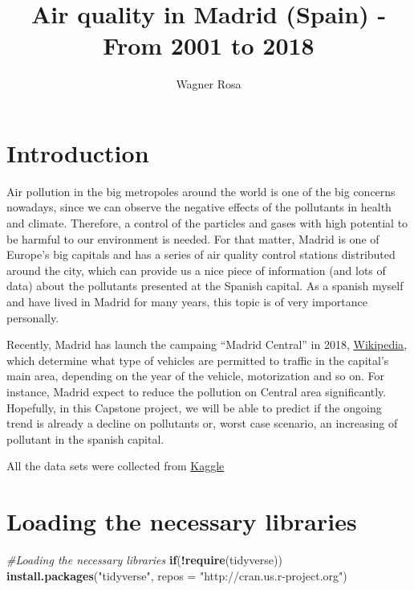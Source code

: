 \documentclass[
]{article}
\title{Air quality in Madrid (Spain) - From 2001 to 2018}
\author{Wagner Rosa}
\date{}
\newenvironment{Shaded}{\begin{snugshade}}{\end{snugshade}}
\newcommand{\CommentTok}[1]{\textcolor[rgb]{0.56,0.35,0.01}{\textit{#1}}}
\newcommand{\ControlFlowTok}[1]{\textcolor[rgb]{0.13,0.29,0.53}{\textbf{#1}}}
\newcommand{\DataTypeTok}[1]{\textcolor[rgb]{0.13,0.29,0.53}{#1}}
\newcommand{\KeywordTok}[1]{\textcolor[rgb]{0.13,0.29,0.53}{\textbf{#1}}}
\newcommand{\NormalTok}[1]{#1}
\newcommand{\OperatorTok}[1]{\textcolor[rgb]{0.81,0.36,0.00}{\textbf{#1}}}
\newcommand{\StringTok}[1]{\textcolor[rgb]{0.31,0.60,0.02}{#1}}
\begin{document}
\maketitle

\hypertarget{introduction}{%
\section{Introduction}\label{introduction}}

Air pollution in the big metropoles around the world is one of the big
concerns nowadays, since we can observe the negative effects of the
pollutants in health and climate. Therefore, a control of the particles
and gases with high potential to be harmful to our environment is
needed. For that matter, Madrid is one of Europe's big capitals and has
a series of air quality control stations distributed around the city,
which can provide us a nice piece of information (and lots of data)
about the pollutants presented at the Spanish capital. As a spanish
myself and have lived in Madrid for many years, this topic is of very
importance personally.

Recently, Madrid has launch the campaing ``Madrid Central'' in 2018,
\href{https://en.wikipedia.org/wiki/Madrid_Central}{Wikipedia}, which
determine what type of vehicles are permitted to traffic in the
capital's main area, depending on the year of the vehicle, motorization
and so on. For instance, Madrid expect to reduce the pollution on
Central area significantly. Hopefully, in this Capstone project, we will
be able to predict if the ongoing trend is already a decline on
pollutants or, worst case scenario, an increasing of pollutant in the
spanish capital.

All the data sets were collected from
\href{https://www.kaggle.com/decide-soluciones/air-quality-madrid}{Kaggle}

\hypertarget{loading-the-necessary-libraries}{%
\section{Loading the necessary
libraries}\label{loading-the-necessary-libraries}}

\begin{Shaded}
\begin{Highlighting}[]
\CommentTok{#Loading the necessary libraries}
\ControlFlowTok{if}\NormalTok{(}\OperatorTok{!}\KeywordTok{require}\NormalTok{(tidyverse)) }\KeywordTok{install.packages}\NormalTok{(}\StringTok{"tidyverse"}\NormalTok{, }\DataTypeTok{repos =} \StringTok{"http://cran.us.r-project.org"}\NormalTok{)}
\end{Highlighting}
\end{Shaded}
\end{document}
